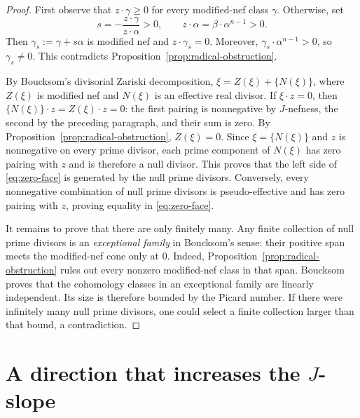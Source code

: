 \documentclass[reqno]{amsart}
\theoremstyle{plain}
\theoremstyle{remark}
\begin{document}
\begin{proof}
First observe that $z\cdot\gamma\geq0$ for every modified-nef class
$\gamma$. Otherwise, set
\[
 s=-\frac{z\cdot\gamma}{z\cdot\alpha}>0,
 \qquad z\cdot\alpha=\beta\cdot\alpha^{n-1}>0.
\]
Then $\gamma_s:=\gamma+s\alpha$ is modified nef and
$z\cdot\gamma_s=0$. Moreover,
$\gamma_s\cdot\alpha^{n-1}>0$, so $\gamma_s\ne0$. This contradicts
Proposition~\ref{prop:radical-obstruction}.

By Boucksom's divisorial Zariski decomposition,
$\xi=Z(\xi)+\{N(\xi)\}$, where $Z(\xi)$ is modified nef and $N(\xi)$ is
an effective real divisor. If $\xi\cdot z=0$, then
$\{N(\xi)\}\cdot z=Z(\xi)\cdot z=0$: the first pairing is nonnegative by
$J$-nefness, the second by the preceding paragraph, and their sum is
zero. By Proposition~\ref{prop:radical-obstruction}, $Z(\xi)=0$.
Since $\xi=\{N(\xi)\}$ and $z$ is nonnegative on every prime divisor,
each prime component of $N(\xi)$ has zero pairing with $z$ and is
therefore a null divisor. This proves that the left
side of \eqref{eq:zero-face} is generated by the null prime divisors.
Conversely, every nonnegative combination of null prime divisors is
pseudo-effective and has zero pairing with $z$, proving equality in
\eqref{eq:zero-face}.

It remains to prove that there are only finitely many.  Any finite
collection of null prime divisors is an \emph{exceptional family} in
Boucksom's sense: their positive span meets the modified-nef cone only
at $0$. Indeed, Proposition~\ref{prop:radical-obstruction} rules out
every nonzero modified-nef class in that span. Boucksom
\cite[Definition~3.12 and Proposition~3.13(iii)]{B04} proves that
the cohomology classes in an exceptional family are linearly independent.
Its size is therefore bounded by the Picard number.  If there were
infinitely many null prime divisors, one could select a finite collection
larger than that bound, a contradiction.
\end{proof}
\section{A direction that increases the \texorpdfstring{$J$}{J}-slope}
\end{document}
